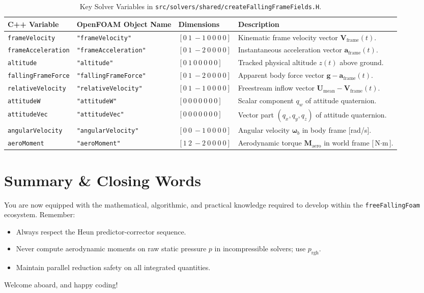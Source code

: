 \documentclass[11pt,a4paper]{article}
\newcommand{\vect}[1]{\mathbf{#1}}
\newcommand{\prgh}{p_{\mathrm{rgh}}}
\newcommand{\aframe}{\vect{a}_{\mathrm{frame}}}
\newcommand{\vframe}{\vect{V}_{\mathrm{frame}}}
\newcommand{\maero}{\vect{M}_{\mathrm{aero}}}
\newcommand{\omegab}{\bm{\omega}_b}
\begin{document}
\begin{table}[H]
    \centering
    \small
    \caption{Key Solver Variables in \texttt{src/solvers/shared/createFallingFrameFields.H}.}
    \label{tab:quick_ref}
    \begin{tabularx}{\textwidth}{l l l X}
        \toprule
        \textbf{C++ Variable} & \textbf{OpenFOAM Object Name} & \textbf{Dimensions} & \textbf{Description} \\
        \midrule
        \texttt{frameVelocity} & \texttt{"frameVelocity"} & $[0\ 1\ -1\ 0\ 0\ 0\ 0]$ & Kinematic frame velocity vector $\vframe(t)$. \\
        \texttt{frameAcceleration} & \texttt{"frameAcceleration"} & $[0\ 1\ -2\ 0\ 0\ 0\ 0]$ & Instantaneous acceleration vector $\aframe(t)$. \\
        \texttt{altitude} & \texttt{"altitude"} & $[0\ 1\ 0\ 0\ 0\ 0\ 0]$ & Tracked physical altitude $z(t)$ above ground. \\
        \texttt{fallingFrameForce} & \texttt{"fallingFrameForce"} & $[0\ 1\ -2\ 0\ 0\ 0\ 0]$ & Apparent body force vector $\vect{g} - \aframe(t)$. \\
        \texttt{relativeVelocity} & \texttt{"relativeVelocity"} & $[0\ 1\ -1\ 0\ 0\ 0\ 0]$ & Freestream inflow vector $\vect{U}_{\mathrm{mean}} - \vframe(t)$. \\
        \texttt{attitudeW} & \texttt{"attitudeW"} & $[0\ 0\ 0\ 0\ 0\ 0\ 0]$ & Scalar component $q_w$ of attitude quaternion. \\
        \texttt{attitudeVec} & \texttt{"attitudeVec"} & $[0\ 0\ 0\ 0\ 0\ 0\ 0]$ & Vector part $(q_x, q_y, q_z)$ of attitude quaternion. \\
        \texttt{angularVelocity} & \texttt{"angularVelocity"} & $[0\ 0\ -1\ 0\ 0\ 0\ 0]$ & Angular velocity $\omegab$ in body frame [rad/s]. \\
        \texttt{aeroMoment} & \texttt{"aeroMoment"} & $[1\ 2\ -2\ 0\ 0\ 0\ 0]$ & Aerodynamic torque $\maero$ in world frame [$\text{N}\cdot\text{m}$]. \\
        \bottomrule
    \end{tabularx}
\end{table}

\section*{Summary \& Closing Words}
You are now equipped with the mathematical, algorithmic, and practical knowledge required to develop within the \texttt{freeFallingFoam} ecosystem. Remember:
\begin{itemize}
    \item Always respect the Heun predictor-corrector sequence.
    \item Never compute aerodynamic moments on raw static pressure $p$ in incompressible solvers; use $\prgh$.
    \item Maintain parallel reduction safety on all integrated quantities.
\end{itemize}
Welcome aboard, and happy coding!
\end{document}
